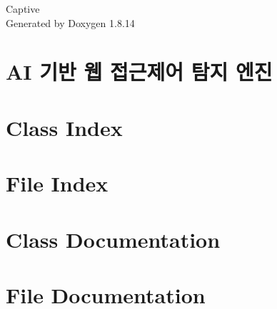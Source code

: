 \documentclass[twoside]{book}
\newcommand{\+}{\discretionary{\mbox{\scriptsize$\hookleftarrow$}}{}{}}
\newcommand{\clearemptydoublepage}{%
  \newpage{\pagestyle{empty}\cleardoublepage}%
}
\begin{document}
\hypersetup{pageanchor=false,
             bookmarksnumbered=true,
             pdfencoding=unicode
            }
\begin{titlepage}
\vspace*{7cm}
\begin{center}%
{\Large Captive }\\
\vspace*{1cm}
{\large Generated by Doxygen 1.8.14}\\
\end{center}
\end{titlepage}
\clearemptydoublepage
{}
\tableofcontents
\clearemptydoublepage
{}
\hypersetup{pageanchor=true}

\chapter{AI 기반 웹 접근제어 탐지 엔진}
\label{index}\hypertarget{index}{}
\chapter{Class Index}

\chapter{File Index}

\chapter{Class Documentation}













\chapter{File Documentation}


\backmatter
\newpage
{}
\clearemptydoublepage
{}
\printindex
\end{document}
